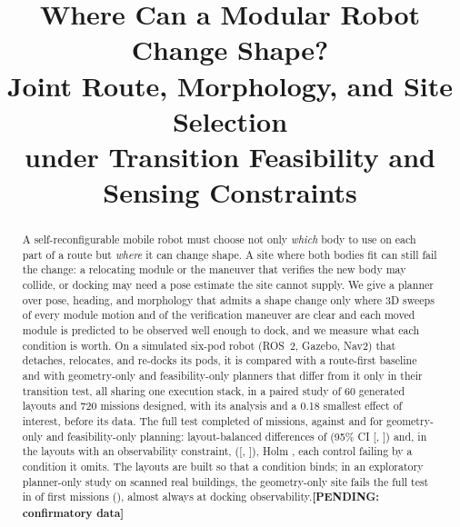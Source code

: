 \documentclass[conference]{IEEEtran}
\newcommand{\pending}[1]{\textbf{[PENDING: #1]}}
\newcommand{\withresults}[2]{\ifdefined\resTrials #1\else #2\fi}
\newcommand{\withreal}[2]{\ifdefined\realBuildings #1\else #2\fi}
\begin{document}
\title{Where Can a Modular Robot Change Shape?\\Joint Route, Morphology, and Site Selection\\under Transition Feasibility and Sensing Constraints}

\author{
}

\maketitle

\begin{abstract}
A self-reconfigurable mobile robot must choose not only \emph{which} body to use on each part of a route but \emph{where} it can change shape. A site where both bodies fit can still fail the change: a relocating module or the maneuver that verifies the new body may collide, or docking may need a pose estimate the site cannot supply. We give a planner over pose, heading, and morphology that admits a shape change only where 3D sweeps of every module motion and of the verification maneuver are clear and each moved module is predicted to be observed well enough to dock, and we measure what each condition is worth. On a simulated six-pod robot (ROS~2, Gazebo, Nav2) that detaches, relocates, and re-docks its pods, it is compared with a route-first baseline and with geometry-only and feasibility-only planners that differ from it only in their transition test, all sharing one execution stack, in a paired study of 60 generated layouts and 720 missions designed, with its analysis and a 0.18 smallest effect of interest, before its data. \withresults{The full test completed \resCompletedSensing{} of \resTrialsSensing{} missions, against \resCompletedGeometry{} and \resCompletedFeasibility{} for geometry-only and feasibility-only planning: layout-balanced differences of \resDeltaVsGeometry{} (95\% CI [\resCILowVsGeometry, \resCIHighVsGeometry]) and, in the \resLayoutsVsFeasibility{} layouts with an observability constraint, \resDeltaVsFeasibility{} ([\resCILowVsFeasibility, \resCIHighVsFeasibility]), Holm \resHolmPVsGeometry, each control failing by a condition it omits. The layouts are built so that a condition binds; \withreal{in an exploratory planner-only study on scanned real buildings, the geometry-only site fails the full test in \realGeomFirstRejected{} of \realGeomFirstSited{} first missions (\realGeomFirstPct), almost always at docking observability.}{}}{\pending{confirmatory data}}
\end{abstract}
\end{document}
